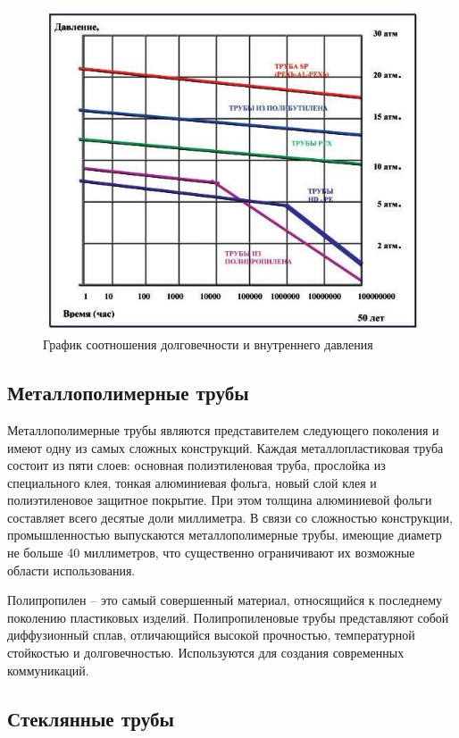 \documentclass[a4paper,12pt,russian]{report}
\begin{document}
\begin{figure}[!htb]
  \centerline{\includegraphics[width=1\textwidth]{95}}
  \caption{График соотношения долговечности и внутреннего давления}
  \label{graph:95}
\end{figure}

\subsection{Металлополимерные трубы}

Металлополимерные трубы являются представителем следующего поколения и имеют одну из самых сложных конструкций. Каждая металлопластиковая труба состоит из пяти слоев: основная полиэтиленовая труба, прослойка из специального клея, тонкая алюминиевая фольга, новый слой клея и полиэтиленовое защитное покрытие. При этом толщина алюминиевой фольги составляет всего десятые доли миллиметра. В связи со сложностью конструкции, промышленностью выпускаются металлополимерные трубы, имеющие диаметр не больше 40 миллиметров, что существенно ограничивают их возможные области использования.

Полипропилен – это самый совершенный материал, относящийся к последнему поколению пластиковых изделий. Полипропиленовые трубы представляют собой диффузионный сплав, отличающийся высокой прочностью, температурной стойкостью и долговечностью. Используются для создания современных коммуникаций.

\subsection{Стеклянные трубы}
\end{document}
